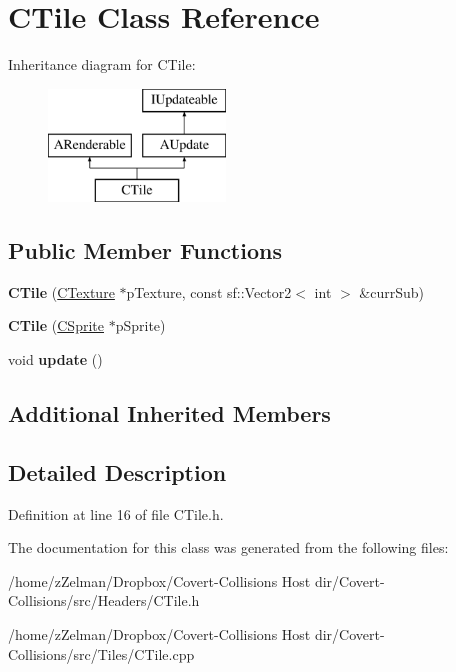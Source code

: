 \hypertarget{classCTile}{\section{C\-Tile Class Reference}
\label{classCTile}
}
Inheritance diagram for C\-Tile\-:\begin{figure}[H]
\begin{center}
\leavevmode
\includegraphics[height=3.000000cm]{classCTile}
\end{center}
\end{figure}
\subsection*{Public Member Functions}
\begin{DoxyCompactItemize}
\item 
\hypertarget{classCTile_a030eef2d18fb054c0fa6738784af0b0d}{{\bfseries C\-Tile} (\hyperlink{classCTexture}{C\-Texture} $\ast$p\-Texture, const sf\-::\-Vector2$<$ int $>$ \&curr\-Sub)}\label{classCTile_a030eef2d18fb054c0fa6738784af0b0d}

\item 
\hypertarget{classCTile_a07c38be9c331480eb7c8d526b084a287}{{\bfseries C\-Tile} (\hyperlink{classCSprite}{C\-Sprite} $\ast$p\-Sprite)}\label{classCTile_a07c38be9c331480eb7c8d526b084a287}

\item 
\hypertarget{classCTile_a818a17e48a7219eedac950b82c641ee0}{void {\bfseries update} ()}\label{classCTile_a818a17e48a7219eedac950b82c641ee0}

\end{DoxyCompactItemize}
\subsection*{Additional Inherited Members}


\subsection{Detailed Description}


Definition at line 16 of file C\-Tile.\-h.



The documentation for this class was generated from the following files\-:\begin{DoxyCompactItemize}
\item 
/home/z\-Zelman/\-Dropbox/\-Covert-\/\-Collisions Host dir/\-Covert-\/\-Collisions/src/\-Headers/C\-Tile.\-h\item 
/home/z\-Zelman/\-Dropbox/\-Covert-\/\-Collisions Host dir/\-Covert-\/\-Collisions/src/\-Tiles/C\-Tile.\-cpp\end{DoxyCompactItemize}
